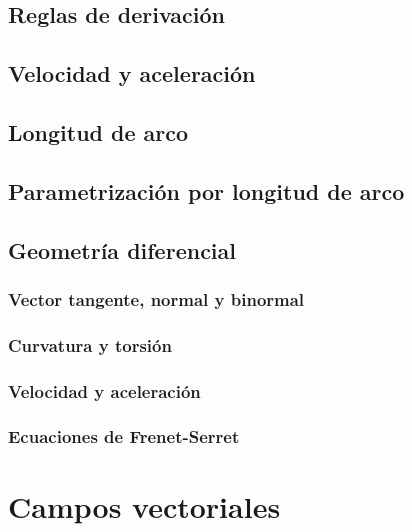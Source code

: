 \documentclass[12pt, fleqn]{report}                             %
\theoremstyle{break}                                            %
\begin{document}
            \subsection{Reglas de derivación}
            
            \subsection{Velocidad y aceleración}
        
            \subsection{Longitud de arco}
            
            \subsection{Parametrización por longitud de arco}
            
            \subsection{Geometría diferencial}
                
                \subsubsection{Vector tangente, normal y binormal}
                
                \subsubsection{Curvatura y torsión}
                
                \subsubsection{Velocidad y aceleración}
                
                \subsubsection{Ecuaciones de Frenet-Serret}
            
        \section{Campos vectoriales}
        
\end{document}
